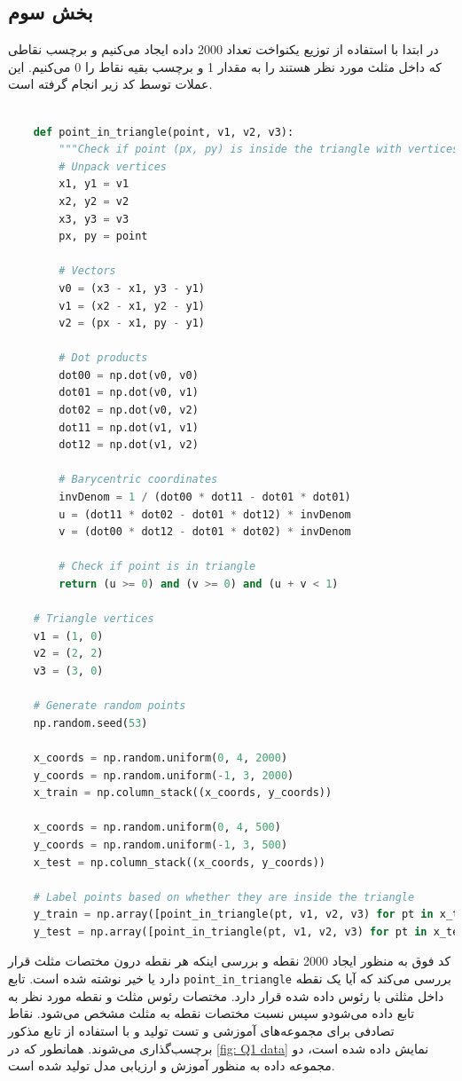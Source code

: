 \documentclass{article}
\begin{document}
	\subsection{بخش سوم}
	در ابتدا با استفاده از توزیع یکنواخت تعداد 2000 داده ایجاد می‌کنیم و برچسب نقاطی که داخل مثلث مورد نظر هستند را به مقدار 1 و برچسب بقیه نقاط را 0 می‌کنیم. این عملات توسط کد زیر انجام گرفته است.
	\begin{LTR}
	\begin{lstlisting}[language=Python, caption=Example Python code]

	def point_in_triangle(point, v1, v2, v3):
		"""Check if point (px, py) is inside the triangle with vertices v1, v2, v3."""
		# Unpack vertices
		x1, y1 = v1
		x2, y2 = v2
		x3, y3 = v3
		px, py = point
		
		# Vectors
		v0 = (x3 - x1, y3 - y1)
		v1 = (x2 - x1, y2 - y1)
		v2 = (px - x1, py - y1)
		
		# Dot products
		dot00 = np.dot(v0, v0)
		dot01 = np.dot(v0, v1)
		dot02 = np.dot(v0, v2)
		dot11 = np.dot(v1, v1)
		dot12 = np.dot(v1, v2)
		
		# Barycentric coordinates
		invDenom = 1 / (dot00 * dot11 - dot01 * dot01)
		u = (dot11 * dot02 - dot01 * dot12) * invDenom
		v = (dot00 * dot12 - dot01 * dot02) * invDenom
		
		# Check if point is in triangle
		return (u >= 0) and (v >= 0) and (u + v < 1)
		
	# Triangle vertices
	v1 = (1, 0)
	v2 = (2, 2)
	v3 = (3, 0)
		
	# Generate random points
	np.random.seed(53)
		
	x_coords = np.random.uniform(0, 4, 2000)
	y_coords = np.random.uniform(-1, 3, 2000)
	x_train = np.column_stack((x_coords, y_coords))
		
	x_coords = np.random.uniform(0, 4, 500)
	y_coords = np.random.uniform(-1, 3, 500)
	x_test = np.column_stack((x_coords, y_coords))
		
	# Label points based on whether they are inside the triangle
	y_train = np.array([point_in_triangle(pt, v1, v2, v3) for pt in x_train]).astype(int)
	y_test = np.array([point_in_triangle(pt, v1, v2, v3) for pt in x_test]).astype(int)

	\end{lstlisting}
	\end{LTR}
کد فوق به منظور ایجاد 2000 نقطه و بررسی اینکه هر نقطه درون مختصات مثلث قرار دارد یا خیر نوشته شده است. تابع
 \texttt{point\_in\_triangle}
  بررسی می‌کند که آیا یک نقطه داخل مثلثی با رئوس داده شده قرار دارد. مختصات رئوس مثلث و نقطه مورد نظر به تابع داده می‌شودو سپس نسبت مختصات نقطه به مثلث مشخص می‌شود. نقاط تصادفی برای مجموعه‌های آموزشی و تست تولید و با استفاده از تابع مذکور برچسب‌گذاری می‌شوند. همانطور که در 
  \autoref{fig: Q1 data}
  نمایش داده شده است، دو مجموعه داده به منظور آموزش و ارزیابی مدل تولید شده است.
  
\end{document}
